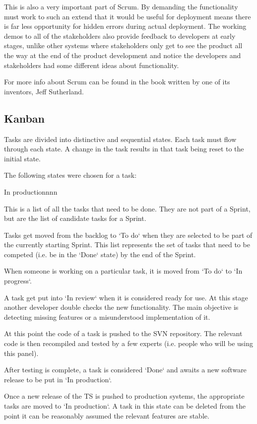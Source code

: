 This is also a very important part of Scrum. By demanding the functionality
must work to such an extend that it would be useful for deployment means there
is far less opportunity for hidden errors during actual deployment.
The working demos to all of the stakeholders also provide feedback to
developers at early stages, unlike other systems where stakeholders only get to
see the product all the way at the end of the product development and notice the
developers and stakeholders had some different ideas about functionality.

For more info about Scrum can be found in the book written by one of its inventors,
Jeff Sutherland\cite{scrumbook}.

\subsection{Kanban}
Tasks are divided into distinctive and sequential states. Each task must flow
through each state.
A change in the task results in that task being reset to the initial state.

The following states were chosen for a task:
\begin{labeling}{In productionnnn}
\item [\textbf{Backlog}] This is a list of all the tasks that need to be done.
They are not part of a Sprint, but are the list of candidate tasks for a Sprint.\\
\item [\textbf{To do}] Tasks get moved from the backlog to `To do` when they are
selected to be part of the currently starting Sprint. This list represents the
set of tasks that need to be competed (i.e. be in the `Done` state) by the end of
the Sprint.\\
\item [\textbf{In progress}] When someone is working on a particular task, it is
moved from `To do` to `In progress`.\\
\item [\textbf{In review}] A task get put into `In review` when it is considered
ready for use. At this stage another developer double checks the new functionality.
The main objective is detecting missing features or a misunderstood implementation of it.\\
\item [\textbf{Testing}] At this point the code of a task is pushed to the SVN
repository. The relevant code is then recompiled and tested by a few experts (i.e.
people who will be using this panel).\\
\item [\textbf{Done}] After testing is complete, a task is considered `Done` and
awaits a new software release to be put in `In production`.\\
\item [\textbf{In production}] Once a new release of the TS is pushed to production
systems, the appropriate tasks are moved to `In production`. A task in this state
can be deleted from the point it can be reasonably assumed the relevant features
are stable.\\
\end{labeling}

